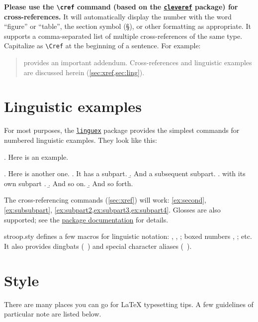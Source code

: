 {\bfseries Please use the \verb|\cref| command (based on the \href{http://tug.ctan.org/macros/latex/contrib/cleveref/cleveref.pdf}{\texttt{cleveref}} package) for cross-references.}
It will automatically display the number with the word ``figure'' or ``table'',
the section symbol (\S), or other formatting as appropriate.
It supports a comma-separated list of multiple cross-references of the same type.
Capitalize as \verb|\Cref| at the beginning of a sentence.
For example:

\begin{quote}
 provides an important addendum. Cross-references and linguistic examples are discussed herein (\cref{sec:xref,sec:ling}).
\end{quote}

\section{Linguistic examples}\label{sec:ling}

For most purposes, the \href{http://texdoc.net/texmf-dist/doc/latex/linguex/linguex-doc.pdf}{\texttt{linguex}} package provides the simplest commands
for numbered linguistic examples. They look like this:

\ex.\label{ex:first} Here is an example.

\ex.\label{ex:second} Here is another one.
    \a. It has a subpart.
    \b.\label{ex:subpart2} And a subsequent subpart.
        \a.\label{ex:subsubpart} with its own subpart
        \z.
    \b.\label{ex:subpart3} And so on.
    \b.\label{ex:subpart4} And so forth.

The cross-referencing commands (\cref{sec:xref}) will work: \cref{ex:second}, \cref{ex:subsubpart}, \cref{ex:subpart2,ex:subpart3,ex:subpart4}.
Glosses are also supported; see the \href{http://mirrors.ctan.org/macros/latex/contrib/linguex/doc/linguex-doc.pdf}{package documentation} for details.

stroop.sty defines a few macros for linguistic notation:
, , ;
boxed numbers , ; etc.
It also provides dingbats (\chk~\xxx) and special character aliases (\backtick~\tat).

\section{Style}

There are many places you can go for \LaTeX{} typesetting tips.
A few guidelines of particular note are listed below.

